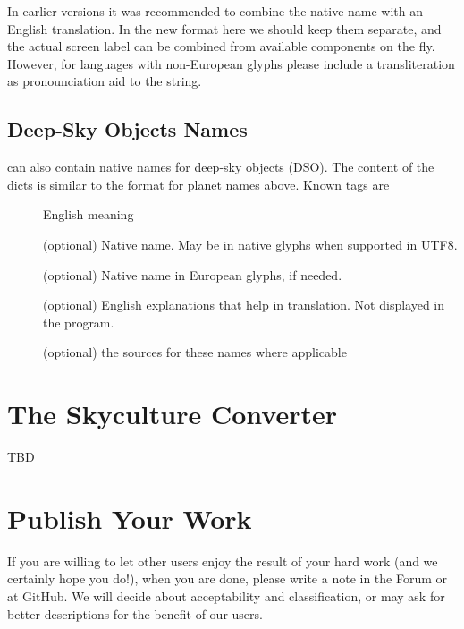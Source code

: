 In earlier versions it was recommended to combine the native name with an English translation. 
In the new format here we should keep them separate, and the actual screen label can be combined from available components on the fly.
However, for languages with non-European glyphs please include a transliteration as pronounciation aid to the  string.



\subsection{Deep-Sky Objects Names}
\label{sec:skycultures:dsonames}

 can also contain native names for
deep-sky objects (DSO). The content  of the dicts is similar to the 
format for planet names above. %
Known tags are 
\begin{description}
\item[] English meaning
\item[] (optional) Native name. May be in native glyphs when supported in UTF8.
\item[] (optional) Native name in European glyphs, if needed.
\item[] (optional) English explanations that help in translation. Not displayed in the program.
\item[]  (optional) the sources for these names where applicable
\end{description}



\section{The Skyculture Converter}
\label{ch:SkyCultures:converter}

TBD



\section{Publish Your Work}
\label{sec:skyculture:publish}

If you are willing to let other users enjoy the result of your hard
work (and we certainly hope you do!), when you are done, please write
a note in the Forum or at GitHub. We will decide about acceptability
and classification, or may ask for better descriptions for the
benefit of our users.


